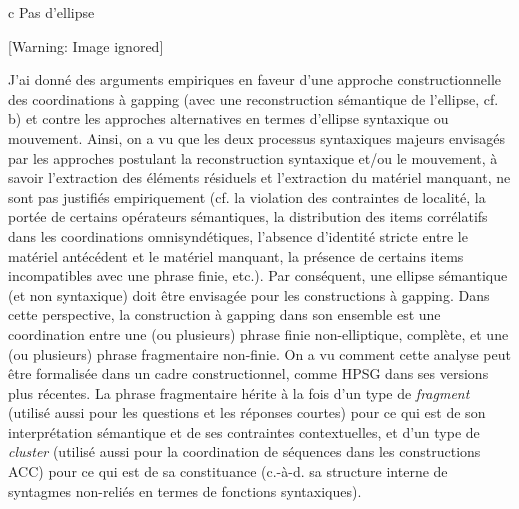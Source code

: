           c  Pas d'ellipse

{   [Warning: Image ignored] %
} 

J'ai donné des arguments empiriques en faveur d'une approche constructionnelle des coordinations à gapping (avec une reconstruction sémantique de l'ellipse, cf. b) et contre les approches alternatives en termes d'ellipse syntaxique ou mouvement. Ainsi, on a vu que les deux processus syntaxiques majeurs envisagés par les approches postulant la reconstruction syntaxique et/ou le mouvement, à savoir l'extraction des éléments résiduels et l'extraction du matériel manquant, ne sont pas justifiés empiriquement (cf. la violation des contraintes de localité, la portée de certains opérateurs sémantiques, la distribution des items corrélatifs dans les coordinations omnisyndétiques, l'absence d'identité stricte entre le matériel antécédent et le matériel manquant, la présence de certains items incompatibles avec une phrase finie, etc.). Par conséquent, une ellipse sémantique (et non syntaxique) doit être envisagée pour les constructions à gapping. Dans cette perspective, la construction à gapping dans son ensemble est une coordination entre une (ou plusieurs) phrase finie non-elliptique, complète, et une (ou plusieurs) phrase fragmentaire non-finie. On a vu comment cette analyse peut être formalisée dans un cadre constructionnel, comme HPSG dans ses versions plus récentes. La phrase fragmentaire hérite à la fois d'un type de \textit{fragment} (utilisé aussi pour les questions et les réponses courtes) pour ce qui est de son interprétation sémantique et de ses contraintes contextuelles, et d'un type de \textit{cluster} (utilisé aussi pour la coordination de séquences dans les constructions ACC) pour ce qui est de sa constituance (c.-à-d. sa structure interne de syntagmes non-reliés en termes de fonctions syntaxiques).

